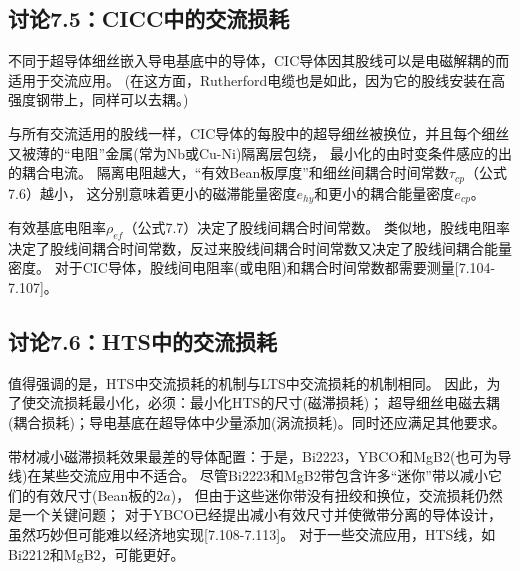 \subsection{讨论7.5：CICC中的交流损耗}
不同于超导体细丝嵌入导电基底中的导体，CIC导体因其股线可以是电磁解耦的而适用于交流应用。
(在这方面，Rutherford电缆也是如此，因为它的股线安装在高强度钢带上，同样可以去耦。)

与所有交流适用的股线一样，CIC导体的每股中的超导细丝被换位，并且每个细丝又被薄的“电阻”金属(常为Nb或Cu-Ni)隔离层包绕，
最小化的由时变条件感应的出的耦合电流。
隔离电阻越大，“有效Bean板厚度”和细丝间耦合时间常数$\tau_{cp}$（公式7.6）越小，
这分别意味着更小的磁滞能量密度$e_{hy}$和更小的耦合能量密度$e_{cp}$。

有效基底电阻率$\rho_{ef}$（公式7.7）决定了股线间耦合时间常数。
类似地，股线电阻率决定了股线间耦合时间常数，反过来股线间耦合时间常数又决定了股线间耦合能量密度。
对于CIC导体，股线间电阻率(或电阻)和耦合时间常数都需要测量[7.104-7.107]。

\subsection{讨论7.6：HTS中的交流损耗}
值得强调的是，HTS中交流损耗的机制与LTS中交流损耗的机制相同。
因此，为了使交流损耗最小化，必须：最小化HTS的尺寸(磁滞损耗)；
超导细丝电磁去耦(耦合损耗)；导电基底在超导体中少量添加(涡流损耗)。同时还应满足其他要求。

带材减小磁滞损耗效果最差的导体配置：于是，Bi2223，YBCO和MgB2(也可为导线)在某些交流应用中不适合。
尽管Bi2223和MgB2带包含许多“迷你”带以减小它们的有效尺寸(Bean板的$2a$)，
但由于这些迷你带没有扭绞和换位，交流损耗仍然是一个关键问题；
对于YBCO已经提出减小有效尺寸并使微带分离的导体设计，虽然巧妙但可能难以经济地实现[7.108-7.113]。
对于一些交流应用，HTS线，如Bi2212和MgB2，可能更好。


